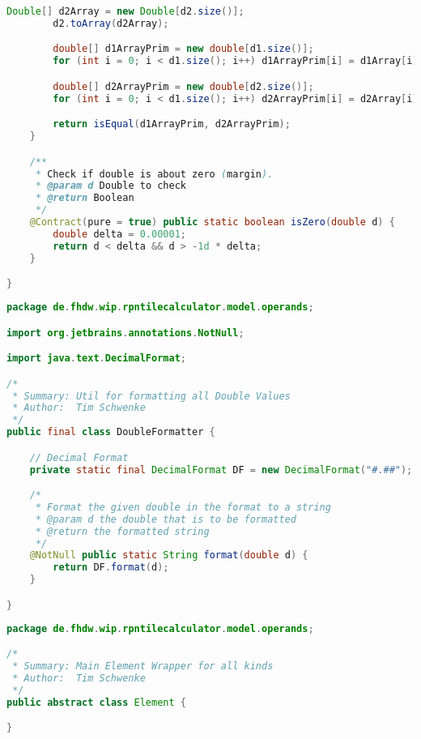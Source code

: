 \begin{lstlisting}[caption=DoubleComparator (Schwenke),label=list:DoubleComparator,language=Java]
        Double[] d2Array = new Double[d2.size()];
        d2.toArray(d2Array);

        double[] d1ArrayPrim = new double[d1.size()];
        for (int i = 0; i < d1.size(); i++) d1ArrayPrim[i] = d1Array[i];

        double[] d2ArrayPrim = new double[d2.size()];
        for (int i = 0; i < d1.size(); i++) d2ArrayPrim[i] = d2Array[i];

        return isEqual(d1ArrayPrim, d2ArrayPrim);
    }

    /**
     * Check if double is about zero (margin).
     * @param d Double to check
     * @return Boolean
     */
    @Contract(pure = true) public static boolean isZero(double d) {
        double delta = 0.00001;
        return d < delta && d > -1d * delta;
    }

}
\end{lstlisting}    

\begin{lstlisting}[caption=DoubleFormatter (Schwenke),label=list:DoubleFormatter,language=Java]
package de.fhdw.wip.rpntilecalculator.model.operands;

import org.jetbrains.annotations.NotNull;

import java.text.DecimalFormat;

/*
 * Summary: Util for formatting all Double Values
 * Author:  Tim Schwenke
 */
public final class DoubleFormatter {

    // Decimal Format
    private static final DecimalFormat DF = new DecimalFormat("#.##");

    /*
     * Format the given double in the format to a string
     * @param d the double that is to be formatted
     * @return the formatted string
     */
    @NotNull public static String format(double d) {
        return DF.format(d);
    }

}

\end{lstlisting} 

\begin{lstlisting}[caption=Element (Schwenke),label=list:Element,language=Java]
package de.fhdw.wip.rpntilecalculator.model.operands;

/*
 * Summary: Main Element Wrapper for all kinds
 * Author:  Tim Schwenke
 */
public abstract class Element {

}
\end{lstlisting}    

